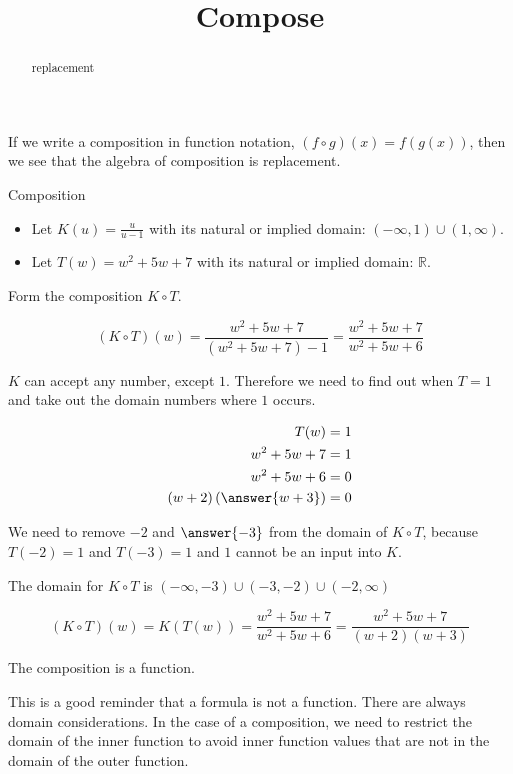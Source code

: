 \documentclass{ximera}
\title{Compose}
\begin{document}
\begin{abstract}
replacement
\end{abstract}
\maketitle





If we write a composition in function notation, $(f \circ g)(x) = f(g(x))$, then we see that the algebra of composition is replacement.





\begin{example} Composition


\begin{itemize}
\item Let $K(u) = \frac{u}{u-1}$ with its natural or implied domain: $(-\infty, 1) \cup (1, \infty)$. 

\item Let $T(w) = w^2 + 5w + 7$ with its natural or implied domain: \textbf{$\mathbb{R}$}.
\end{itemize}


Form the composition $K \circ T$.

\[        (K \circ T)(w) =     \frac{w^2 + 5w + 7}{(w^2 + 5w + 7)-1}   =    \frac{w^2 + 5w + 7}{w^2 + 5w + 6}  \]


$K$ can accept any number, except $1$.  Therefore we need to find out when $T = 1$ and take out the domain numbers where $1$ occurs.



\begin{align*}
T(w) & = 1   \\
w^2 + 5w + 7 & = 1 \\
w^2 + 5w + 6 & = 0   \\
(w+2)\left( \answer{w+3} \right) & = 0
\end{align*}


We need to remove $-2$ and $\answer{-3}$ from the domain of $K \circ T$, because $T(-2)=1$ and $T(-3)=1$ and $1$ cannot be an input into $K$.


The domain for $K \circ T$ is $(-\infty, -3) \cup (-3, -2) \cup (-2, \infty)$




\[        (K \circ T)(w)  =  K(T(w))  = \frac{w^2 + 5w + 7}{w^2 + 5w + 6}  =    \frac{w^2 + 5w + 7}{(w+2)(w+3)} \]










The composition is a function. 


This is a good reminder that a formula is not a function. There are always domain considerations.  In the case of a composition, we need to restrict the domain of the inner function to avoid inner function values that are not in the domain of the outer function.










\end{example}
\end{document}
